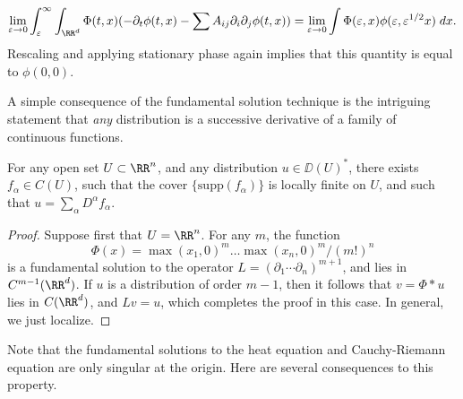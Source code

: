 \begin{example}
    \begin{align*}
        \lim_{\varepsilon \to 0} \int_\varepsilon^\infty \int_{\RR^d} \Phi(t,x) (- \partial_t \phi(t,x) - \sum A_{ij} \partial_i \partial_j \phi(t,x)) = \lim_{\varepsilon \to 0} \int \Phi(\varepsilon,x) \phi(\varepsilon, \varepsilon^{1/2} x)\; dx.
    \end{align*}
    Rescaling and applying stationary phase again implies that this quantity is equal to $\phi(0,0)$.
\end{example}

A simple consequence of the fundamental solution technique is the intriguing statement that \emph{any} distribution is a successive derivative of a family of continuous functions.

\begin{theorem}
    For any open set $U \subset \RR^n$, and any distribution $u \in \DD(U)^*$, there exists $f_\alpha \in C(U)$, such that the cover $\{ \text{supp}(f_\alpha) \}$ is locally finite on $U$, and such that $u = \sum_\alpha D^\alpha f_\alpha$.
\end{theorem}
\begin{proof}
    Suppose first that $U = \RR^n$. For any $m$, the function
    \[ \Phi(x) = \max(x_1,0)^m \dots \max(x_n,0)^m / (m!)^n \]
    is a fundamental solution to the operator $L = (\partial_1 \cdots \partial_n)^{m+1}$, and lies in $C^{m-1}(\RR^d)$. If $u$ is a distribution of order $m-1$, then it follows that $v = \Phi * u$ lies in $C(\RR^d)$, and $Lv = u$, which completes the proof in this case. In general, we just localize.
\end{proof}

Note that the fundamental solutions to the heat equation and Cauchy-Riemann equation are only singular at the origin. Here are several consequences to this property.

